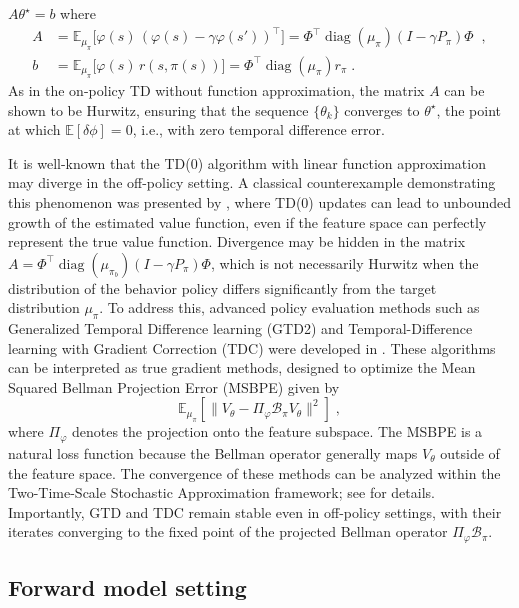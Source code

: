 \documentclass{article}
\numberwithin{equation}{section}
\newcommand{\E}{\mathbb E}
\newcommand{\eqsp}{\;}
\begin{document}
\(A \theta^\star = b\) where
\begin{align}
    A &= \mathbb{E}_{\mu_\pi} \big[ \varphi(s)\,(\varphi(s) - \gamma \varphi(s'))^\top \big] = \Phi^\top \operatorname{diag}(\mu_{\pi} )(I - \gamma P_\pi) \Phi\eqsp\eqsp,\\
    b &= \mathbb{E}_{\mu_\pi} \big[ \varphi(s)\, r(s,\pi(s))\big] = \Phi^\top \operatorname{diag}(\mu_{\pi}) r_\pi\eqsp.
\end{align}
As in the on-policy TD without function approximation, the matrix $A$ can be shown to be Hurwitz, ensuring that the sequence $\{\theta_k\}$ converges to $\theta^\star$, the point at which $\mathbb{E}[\delta \phi] = 0$, i.e., with zero temporal difference error.



It is well-known that the TD(0) algorithm with linear function approximation may diverge in the off-policy setting. 
A classical counterexample demonstrating this phenomenon was presented by \citet{baird1995residual}, where TD(0) updates can lead to unbounded growth of the estimated value function, even if the feature space can perfectly represent the true value function. Divergence may be hidden in the matrix
\(A = \Phi^\top \operatorname{diag}(\mu_{\pi_b}) (I - \gamma P_\pi) \Phi\), which is not necessarily Hurwitz when the distribution of the behavior policy differs significantly from the target distribution $\mu_\pi$. To address this, advanced policy evaluation methods such as Generalized Temporal Difference learning (GTD2) and Temporal-Difference learning with Gradient Correction (TDC) were developed in \cite{sutton2008convergent,sutton:gtd2:2009}. These algorithms can be interpreted as true gradient methods, designed to optimize the Mean Squared Bellman Projection Error (MSBPE) given by
\[\E_{\mu_\pi}[\|V_\theta - \Pi_{\varphi}\mathcal{B}_\pi V_\theta\|^2]\eqsp,\]
where \(\Pi_\varphi\) denotes the projection onto the feature subspace.
The MSBPE is a natural loss function because the Bellman operator generally maps \(V_\theta\) outside of the feature space. The convergence of these methods can be analyzed within the Two-Time-Scale Stochastic Approximation framework; see \cite{butyrin2026gaussian} for details. Importantly, GTD and TDC remain stable even in off-policy settings, with their iterates converging to the fixed point of the projected Bellman operator \(\Pi_\varphi \mathcal{B}_\pi\).

\begin{center}
    \section{Forward model setting}\label{sec:forward}
\end{center}
\end{document}
